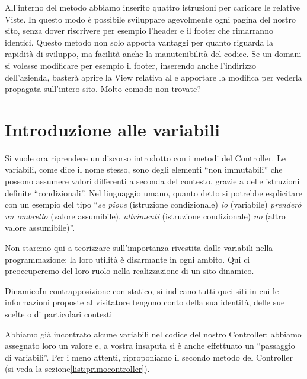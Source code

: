 All'interno del metodo  abbiamo inserito quattro istruzioni per caricare le relative Viste. In questo modo è possibile sviluppare agevolmente ogni pagina del nostro sito, senza dover riscrivere per esempio l'header e il footer che rimarranno identici. Questo metodo non solo apporta vantaggi per quanto riguarda la rapidità di sviluppo, ma facilità anche la manutenibilità del codice. Se un domani si volesse modificare per esempio il footer, inserendo anche l'indirizzo dell'azienda, basterà aprire la View relativa al  e apportare la modifica per vederla propagata sull'intero sito. Molto comodo non trovate?

\label{sec:passaggio}
\section*{Introduzione alle variabili}
Si vuole ora riprendere un discorso introdotto con i metodi del Controller. Le variabili, come dice il nome stesso, sono degli elementi ``non immutabili'' che possono assumere valori differenti a seconda del contesto, grazie a delle istruzioni definite ``condizionali''. Nel linguaggio umano, quanto detto si potrebbe esplicitare con un esempio del tipo ``\emph{se piove} (istruzione condizionale)  \emph{io} (variabile) \emph{prenderò un ombrello} (valore assumibile),\emph{ altrimenti} (istruzione condizionale) \emph{no} (altro valore assumibile)''.

Non staremo qui a teorizzare sull'importanza rivestita dalle variabili nella programmazione: la loro utilità è disarmante in ogni ambito. Qui ci preoccuperemo del loro ruolo nella realizzazione di un sito dinamico.

\begin{deftab}{Dinamico}{In contrapposizione con statico, si indicano tutti quei siti in cui le informazioni proposte al visitatore tengono conto della sua identità, delle sue scelte o di particolari contesti}
\end{deftab}

Abbiamo già incontrato alcune variabili nel codice del nostro Controller: abbiamo assegnato loro un valore e, a vostra insaputa si è anche effettuato un ``passaggio di variabili''. Per i meno attenti, riproponiamo il secondo metodo del Controller  (si veda la sezione\vref{list:primocontroller}).



